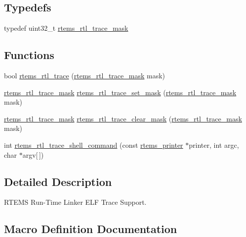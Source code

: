 \subsection*{Typedefs}
\begin{DoxyCompactItemize}
\item 
typedef uint32\+\_\+t \mbox{\hyperlink{rtl-trace_8h_a5cfd053d8ebf1ee26e60b11ce50cc521}{rtems\+\_\+rtl\+\_\+trace\+\_\+mask}}
\end{DoxyCompactItemize}
\subsection*{Functions}
\begin{DoxyCompactItemize}
\item 
bool \mbox{\hyperlink{rtl-trace_8h_ac04c6d098f19ac5fae73682e2f279e38}{rtems\+\_\+rtl\+\_\+trace}} (\mbox{\hyperlink{rtl-trace_8h_a5cfd053d8ebf1ee26e60b11ce50cc521}{rtems\+\_\+rtl\+\_\+trace\+\_\+mask}} mask)
\item 
\mbox{\hyperlink{rtl-trace_8h_a5cfd053d8ebf1ee26e60b11ce50cc521}{rtems\+\_\+rtl\+\_\+trace\+\_\+mask}} \mbox{\hyperlink{rtl-trace_8h_a7c38294764d873297cfd2089a094169d}{rtems\+\_\+rtl\+\_\+trace\+\_\+set\+\_\+mask}} (\mbox{\hyperlink{rtl-trace_8h_a5cfd053d8ebf1ee26e60b11ce50cc521}{rtems\+\_\+rtl\+\_\+trace\+\_\+mask}} mask)
\item 
\mbox{\hyperlink{rtl-trace_8h_a5cfd053d8ebf1ee26e60b11ce50cc521}{rtems\+\_\+rtl\+\_\+trace\+\_\+mask}} \mbox{\hyperlink{rtl-trace_8h_a9f47ce79badafef2b3e1fb3806a12809}{rtems\+\_\+rtl\+\_\+trace\+\_\+clear\+\_\+mask}} (\mbox{\hyperlink{rtl-trace_8h_a5cfd053d8ebf1ee26e60b11ce50cc521}{rtems\+\_\+rtl\+\_\+trace\+\_\+mask}} mask)
\item 
int \mbox{\hyperlink{rtl-trace_8h_aea463de321ff9a8daf485fa2722e9c38}{rtems\+\_\+rtl\+\_\+trace\+\_\+shell\+\_\+command}} (const \mbox{\hyperlink{structrtems__printer}{rtems\+\_\+printer}} $\ast$printer, int argc, char $\ast$argv\mbox{[}$\,$\mbox{]})
\end{DoxyCompactItemize}


\subsection{Detailed Description}
R\+T\+E\+MS Run-\/\+Time Linker E\+LF Trace Support. 



\subsection{Macro Definition Documentation}
\mbox{\label{rtl-trace_8h_a6066050a07fb6e0ea62bac07f93dc7b3}} 
